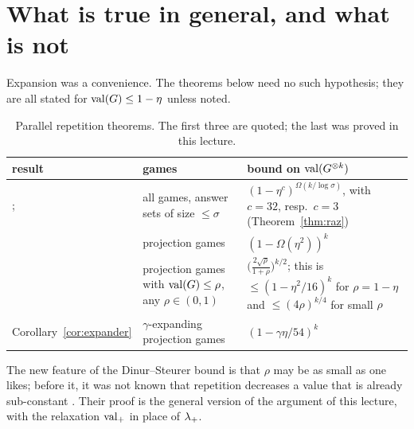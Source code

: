 \section{What is true in general, and what is not}
\label{sec:general}

Expansion was a convenience.  The theorems below need no such hypothesis; they are all stated for $\operatorname{val}(G)\le1-\eta$ unless noted.

\begin{table}[t]
\centering\small
\renewcommand{\arraystretch}{1.3}
\begin{tabular}{@{}l>{\raggedright\arraybackslash}p{3.6cm}>{\raggedright\arraybackslash}p{4.9cm}@{}}
\toprule
result & games & bound on $\operatorname{val}(G^{\otimes k})$\\
\midrule
\citet{Raz98}; \citet{Holenstein09} & all games, answer sets of size $\le\sigma$ & $(1-\eta^{c})^{\Omega(k/\log\sigma)}$, with $c=32$, resp.\ $c=3$ (Theorem~\ref{thm:raz})\\
\citet{Rao11} & projection games & $(1-\Omega(\eta^2))^k$\\
\citet{DinurSteurer14} & projection games with $\operatorname{val}(G)\le\rho$, any $\rho\in(0,1)$ & $\big(\frac{2\sqrt\rho}{1+\rho}\big)^{k/2}$; this is $\le(1-\eta^2/16)^k$ for $\rho=1-\eta$ and $\le(4\rho)^{k/4}$ for small $\rho$\\
Corollary~\ref{cor:expander} & $\gamma$-expanding projection games & $(1-\gamma\eta/54)^k$\\
\bottomrule
\end{tabular}
\caption{Parallel repetition theorems.  The first three are quoted; the last was proved in this lecture.}
\label{tab:rep-thms}
\end{table}

\noindent
The new feature of the Dinur--Steurer bound is that $\rho$ may be as small as one likes; before it, it was not known that repetition decreases a value that is already sub-constant \citep[Section~1]{DinurSteurer14}.  Their proof is the general version of the argument of this lecture, with the relaxation $\operatorname{val}_+$ in place of $\lambda_{+}$.

